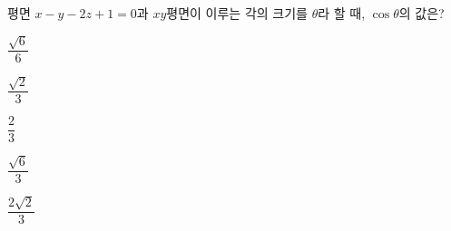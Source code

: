 평면 $x-y-2z+1=0$과 $xy$평면이 이루는 각의 크기를 $\theta$라 할 때, $\cos\theta$의 값은?
\begin{choices32}{\rule[-3ex]{0pt}{8ex}$\dfrac{\sqrt{6}}{6}$}{\rule[-3ex]{0pt}{8ex}$\dfrac{\sqrt{2}}{3}$}{\rule[-3ex]{0pt}{8ex}$\dfrac{2}{3}$}{\rule[-3ex]{0pt}{8ex}$\dfrac{\sqrt{6}}{3}$}{\rule[-3ex]{0pt}{8ex}$\dfrac{2\sqrt{2}}{3}$}\end{choices32}
